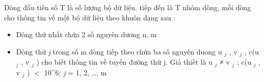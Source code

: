 Dòng đầu tiên số T là số lượng bộ dữ liệu. tiếp đến là T nhóm dòng, mỗi dòng cho thông tin về một bộ dữ liệu theo khuôn dạng sau :
\begin{itemize}
	\item Dòng thứ nhất chứa 2 số nguyên dương n, m
	\item Dòng thứ \emph{ j } trong số m dòng tiếp theo chứa ba số nguyên duong u $_ j $ , v $_ j $ , c(u $_ j $ , v $_ j $ ) cho biết thông tin về tuyến đường thứ j. Giả thiết là u $_ j $ ≠ v $_ j $ ; c(u $_ j $ , v $_ j $ ) $<$ 10^6; \emph{ j } = 1, 2, …, m
\end{itemize}

\